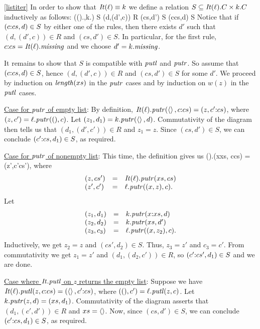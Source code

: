 \begin{defn}[$R$-similarity]
\begin{theorem}
\begin{lemma}
\begin{theorem}[No products]
\begin{lemma}
\begin{defn}
\begin{theorem}
\begin{pfof}{\ref{listiter}}
In order to show that $\mathit{It}(\ell) \equiv k$ we define a relation $S \subseteq
\mathit{It}(\ell).C \times k.C$ inductively as follows: 
\infax
  {(\IT(\ell).\missing,k.\missing) \in S}
\infrule
  {(d,(d',c)) \in R  \andalso  (cs,d') \in S}
  {(c{\CONS}cs,d) \in S}
Notice that if $(c{\mathord{:}}cs,d)\in S$ by either one of the rules, then there
exists 
$d'$ such that $(d,(d',c)) \in R$ and $(cs,d') \in S$.  In particular, for
the first rule, $c{\mathord{:}}cs=\mathit{It}(\ell).\mathit{missing}$ and we choose $d'=k.\mathit{missing}$.

It remains to show that $S$ is compatible with $\mathit{putl}$ and $\mathit{putr}$.  So
assume that $(c{\mathord{:}}cs,d) \in S$, hence $(d,(d',c)) \in R$ and $(cs,d')
\in S$ for some $d'$. We proceed by induction on $\mathit{length}(xs)$ in the $\mathit{putr}$
cases and by induction on $w(z)$ in the $\mathit{putl}$ cases.

\smallskip \noindent
\underline{Case for $\mathit{putr}$ of empty list}: 
By definition,
%
$\mathit{It}(\ell).\mathit{putr}(\left<\right>,c{\mathord{:}}cs) = (z,c'{\mathord{:}}cs)$, where $(z,c') =
\ell.\mathit{putr}({()},c)$.
%        
Let $(z_1,d_1) = k.\mathit{putr}(\left<\right>,d)$. 
%
Commutativity of the diagram
then tells us that $(d_1,(d',c')) \in R$ and $z_1=z$.  Since $(cs,d') \in S$, we
can conclude $(c'{\mathord{:}}cs,d_1) \in S$, as required.
        
\smallskip \noindent
\underline{Case for $\mathit{putr}$ of nonempty list}:  This time, the definition
gives us
\dissdis\IT(\ell).\putr(x{\CONS}xs, c{\CONS}cs) = (z',c'{\CONS}cs'),\dissdis
where
\[
\begin{array}{lcl}
(z,cs') &=& \mathit{It}(\ell).\mathit{putr}(xs,cs) \\
(z',c') &=& \ell.\mathit{putr}((x,z),c).
\end{array}
\]
%
Let 
\[
\begin{array}{lcl}
(z_1,d_1) &=& k.\mathit{putr}(x{\mathord{:}}xs,d) \\
(z_2,d_2) &=& k.\mathit{putr}(xs,d')  \\
(z_3,c_3) &=& \ell.\mathit{putr}((x,z_2),c).
\end{array}
\]
Inductively, we get $z_2=z$ and $(cs',d_2) \in S$. Thus, $z_3=z'$ and
$c_3=c'$.  From commutativity we get $z_1 = z'$ and $(d_1,(d_2,c')) \in R$, so
$(c'{\mathord{:}}cs',d_1) \in S$ and we are done.  

\smallskip \noindent
\underline{Case where $\mathit{It}.\mathit{putl}$ on $z$ returns the empty list}: 
Suppose we have
%
        $\mathit{It}(\ell).\mathit{putl}(z,c\mathord{:}{}cs) = (\left<\right>,c'\mathord{:}{}cs)$, where 
        $({()},c') = \ell.\mathit{putl}(z,c)$.
        Let $k.\mathit{putr}(z,d) = (xs,d_1)$.  Commutativity of the diagram
        asserts that $(d_1,(c',d')) \in R$ and $xs=\left<\right>$. Now, since
        $(cs,d')\in S$, we can conclude $(c'\mathord{:}{}cs,d_1) \in S$, as
        required.


\end{pfof}
\end{theorem}
\end{defn}
\end{lemma}
\end{theorem}
\end{lemma}
\end{theorem}
\end{defn}
